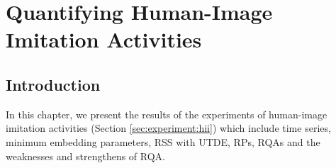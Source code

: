 
\chapter{Quantifying Human-Image Imitation Activities} \label{chapter5}

%

\graphicspath{{figs/chapter5/PDF/}}




\section{Introduction}
In this chapter, we present the results of the experiments of 
human-image imitation activities (Section \ref{sec:experiment:hii}) 
which include time series, minimum embedding parameters, RSS with UTDE, 
RPs, RQAs and the weaknesses and strengthens of RQA.

